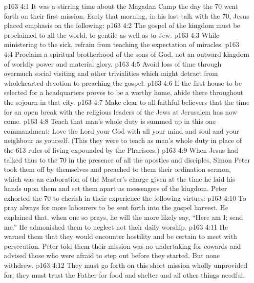 \vs p163 4:1 It was a stirring time about the Magadan Camp the day the 70 went forth on their first mission. Early that morning, in his last talk with the 70, Jesus placed emphasis on the following:
\vs p163 4:2 \bibnobreakspace The gospel of the kingdom must be proclaimed to all the world, to gentile as well as to Jew.
\vs p163 4:3 \bibnobreakspace While ministering to the sick, refrain from teaching the expectation of miracles.
\vs p163 4:4 \bibnobreakspace Proclaim a spiritual brotherhood of the sons of God, not an outward kingdom of worldly power and material glory.
\vs p163 4:5 \bibnobreakspace Avoid loss of time through overmuch social visiting and other trivialities which might detract from wholehearted devotion to preaching the gospel.
\vs p163 4:6 \bibnobreakspace If the first house to be selected for a headquarters proves to be a worthy home, abide there throughout the sojourn in that city.
\vs p163 4:7 \bibnobreakspace Make clear to all faithful believers that the time for an open break with the religious leaders of the Jews at Jerusalem has now come.
\vs p163 4:8 \bibnobreakspace Teach that man’s whole duty is summed up in this one commandment: Love the Lord your God with all your mind and soul and your neighbour as yourself. (This they were to teach as man’s whole duty in place of the 613 rules of living expounded by the Pharisees.)
\vs p163 4:9 \pc When Jesus had talked thus to the 70 in the presence of all the apostles and disciples, Simon Peter took them off by themselves and preached to them their ordination sermon, which was an elaboration of the Master’s charge given at the time he laid his hands upon them and set them apart as messengers of the kingdom. Peter exhorted the 70 to cherish in their experience the following virtues:
\vs p163 4:10 \bibnobreakspace {} To pray always for more labourers to be sent forth into the gospel harvest. He explained that, when one so prays, he will the more likely say, “Here am I; send me.” He admonished them to neglect not their daily worship.
\vs p163 4:11 \bibnobreakspace {} He warned them that they would encounter hostility and be certain to meet with persecution. Peter told them their mission was no undertaking for cowards and advised those who were afraid to step out before they started. But none withdrew.
\vs p163 4:12 \bibnobreakspace {} They must go forth on this short mission wholly unprovided for; they must trust the Father for food and shelter and all other things needful.
